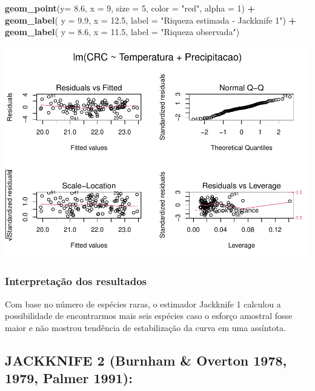 \documentclass[
]{book}
\newenvironment{Shaded}{\begin{snugshade}}{\end{snugshade}}
\newcommand{\DataTypeTok}[1]{\textcolor[rgb]{0.13,0.29,0.53}{#1}}
\newcommand{\DecValTok}[1]{\textcolor[rgb]{0.00,0.00,0.81}{#1}}
\newcommand{\FloatTok}[1]{\textcolor[rgb]{0.00,0.00,0.81}{#1}}
\newcommand{\KeywordTok}[1]{\textcolor[rgb]{0.13,0.29,0.53}{\textbf{#1}}}
\newcommand{\NormalTok}[1]{#1}
\newcommand{\OperatorTok}[1]{\textcolor[rgb]{0.81,0.36,0.00}{\textbf{#1}}}
\newcommand{\StringTok}[1]{\textcolor[rgb]{0.31,0.60,0.02}{#1}}
\begin{document}
\begin{Shaded}
\begin{Highlighting}[]
\StringTok{  }\KeywordTok{geom_point}\NormalTok{(}\DataTypeTok{y=} \FloatTok{8.6}\NormalTok{, }\DataTypeTok{x =} \DecValTok{9}\NormalTok{, }\DataTypeTok{size =} \DecValTok{5}\NormalTok{, }\DataTypeTok{color =} \StringTok{"red"}\NormalTok{, }\DataTypeTok{alpha =} \DecValTok{1}\NormalTok{) }\OperatorTok{+}\StringTok{ }
\StringTok{  }\KeywordTok{geom_label}\NormalTok{( }\DataTypeTok{y =} \FloatTok{9.9}\NormalTok{, }\DataTypeTok{x =} \FloatTok{12.5}\NormalTok{, }\DataTypeTok{label =} \StringTok{"Riqueza estimada - Jackknife 1"}\NormalTok{) }\OperatorTok{+}
\StringTok{  }\KeywordTok{geom_label}\NormalTok{( }\DataTypeTok{y =} \FloatTok{8.6}\NormalTok{, }\DataTypeTok{x =} \FloatTok{11.5}\NormalTok{, }\DataTypeTok{label =} \StringTok{"Riqueza observada"}\NormalTok{)}
\end{Highlighting}
\end{Shaded}

\includegraphics{livro_r_ecologia_files/figure-latex/unnamed-chunk-11-1.pdf}

\hypertarget{interpretauxe7uxe3o-dos-resultados-5}{%
\subsubsection{Interpretação dos resultados}\label{interpretauxe7uxe3o-dos-resultados-5}}

Com base no número de espécies raras, o estimador Jackknife 1 calculou a possibilidade de encontrarmos mais seis espécies caso o esforço amostral fosse maior e não mostrou tendência de estabilização da curva em uma assíntota.

\hypertarget{jackknife-2-burnham-overton-1978-1979-palmer-1991}{%
\subsection{JACKKNIFE 2 (Burnham \& Overton 1978, 1979, Palmer 1991):}\label{jackknife-2-burnham-overton-1978-1979-palmer-1991}}
\end{document}
